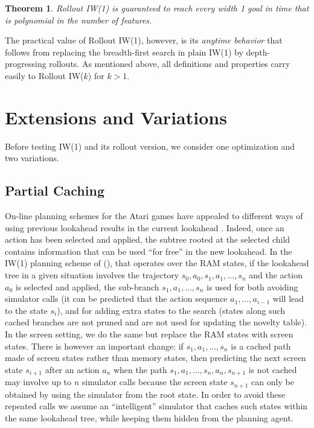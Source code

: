 \documentclass[letterpaper]{article}
\newtheorem{theorem}[definition]{Theorem}
\begin{document}
\begin{theorem}
Rollout IW(1) is guaranteed to reach every width 1 goal in time that is polynomial in the number of features.
\end{theorem}

The practical value of Rollout IW(1), however,  is its \emph{anytime behavior} that
follows from replacing the breadth-first search in plain IW(1) by depth-progressing
rollouts. As mentioned above, all definitions and properties carry easily
to Rollout IW($k$) for $k > 1$. 


\section{Extensions and Variations}

Before testing IW(1) and its rollout version, we consider one optimization and two variations.


\subsection{Partial Caching}

On-line planning schemes for the Atari games have appealed to different ways of using  previous lookahead results
in the current lookahead \cite{ale}. Indeed, once an action has been selected and applied, the subtree rooted
at the selected child contains information that can be used ``for free''  in the new lookahead. 
In the IW(1) planning scheme of \citeauthor{nir:ijcai2015} (\citeyear{nir:ijcai2015}), that operates over
the RAM states, if the lookahead tree in a given situation involves the trajectory $s_0,a_0,s_1,a_1,\ldots,s_n$
and the action $a_0$ is selected and applied, the sub-branch $s_1,a_1, \ldots,s_n$ is used for both
avoiding simulator calls (it can be predicted that the action sequence $a_1,\ldots, a_{i-1}$ will lead to
the state $s_i$), and for adding extra states to the search (states along such cached branches are not
pruned and are not used for updating the novelty table).  In the screen setting, we do the same but replace
the RAM states with screen states. There is however an important change: if $s_1,a_1,\ldots,s_n$ is a cached
path made of screen states rather than memory states, then predicting the next screen state $s_{i+1}$
after an action $a_n$ when the path $s_1,a_1,\ldots,s_n,a_n,s_{n+1}$ is not cached may involve
up to $n$ simulator calls because the screen state $s_{n+1}$ can only be obtained by using
the simulator from the root state.
In order to avoid these repeated  calls we assume an ``intelligent'' simulator that caches such states within
the same lookahead tree, while keeping them hidden from the planning agent.
\end{document}
